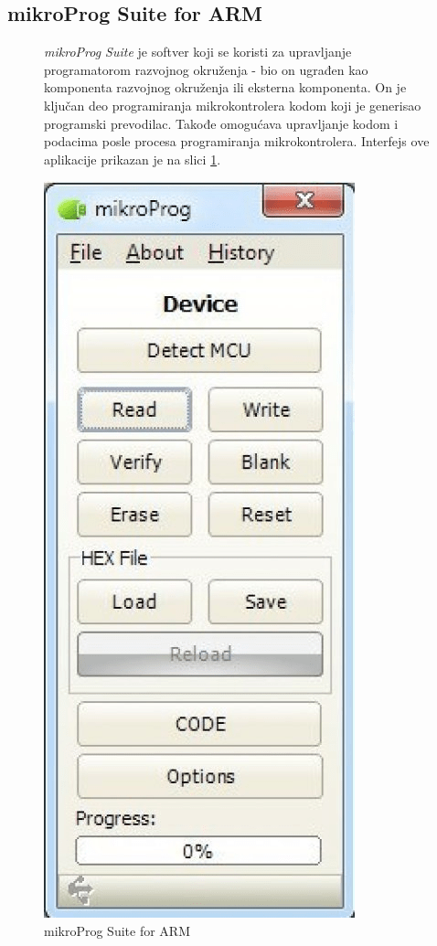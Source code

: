 \documentclass[a4paper, 12pt, oneside, titlepage]{article}
\begin{document}
      \subsection{mikroProg Suite for ARM}
      \begin{figure}[H]
      \noindent\begin{minipage}[t]{0.7\textwidth}
	\emph{mikroProg Suite} je softver koji se koristi za upravljanje programatorom razvojnog okruženja - bio on ugrađen kao komponenta razvojnog okruženja ili eksterna komponenta.
	On je ključan deo programiranja mikrokontrolera kodom koji je generisao programski prevodilac. Takođe omogućava upravljanje kodom i podacima posle procesa programiranja
	mikrokontrolera. Interfejs ove aplikacije prikazan je na slici \ref{fig:mikroprog_suite_arm}.
      \end{minipage}%
      \hfill%
      \begin{minipage}[t]{0.3\textwidth}
	\centering
	\includegraphics[scale=0.27, valign=t]{slike/mikroprog_suite_arm}
	\caption{mikroProg Suite for ARM}
	\label{fig:mikroprog_suite_arm} %
      \end{minipage}%
      \end{figure}
    
\end{document}
